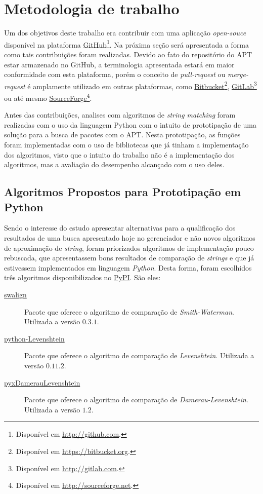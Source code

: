 \section{Metodologia de trabalho} %
\label{sec:contribuindo_com_plataformas_abertas}

Um dos objetivos deste trabalho era contribuir com uma aplicação \textit{open-souce} disponível na plataforma \href{http://github.com}{GitHub}\footnote{Disponível em \url{http://github.com}.}. Na próxima seção será apresentada a forma como tais contribuições foram realizadas. Devido ao fato do repositório do {\code APT} estar armazenado no GitHub, a terminologia apresentada estará em maior conformidade com esta plataforma, porém o conceito de \textit{pull-request} ou  \textit{merge-request} é amplamente utilizado em outras plataformas, como \href{https://bitbucket.org/}{Bitbucket}\footnote{Disponível em \url{https://bitbucket.org}.}, \href{https://gitlab.com/}{GitLab}\footnote{Disponível em \url{http://gitlab.com}.} ou até mesmo \href{http://sourceforge.net/}{SourceForge}\footnote{Disponível em \url{http://sourceforge.net}.}.

Antes das contribuições, analises com algoritmos de \textit{string matching} foram realizadas com o uso da linguagem Python com o intuito de prototipação de uma solução  para a busca de pacotes com o APT. Nesta prototipação, as funções foram implementadas com o uso de bibliotecas que já tinham a implementação dos algoritmos, visto que o intuito do trabalho não é a implementação dos algoritmos, mas a avaliação do desempenho alcançado com o uso deles.

\subsection*{Algoritmos Propostos para Prototipação em Python} %
\label{sec:algoritmos_propostos}

Sendo o interesse do estudo apresentar alternativas para a qualificação dos resultados de uma busca apresentado hoje no gerenciador e não novos algoritmos de aproximação de \textit{string}, foram priorizados algoritmos de implementação pouco rebuscada, que apresentassem bons resultados de comparação de \textit{strings} e que já estivessem implementados em linguagem \textit{Python}. Desta forma, foram escolhidos três algoritmos disponibilizados no \href{https://pypi.python.org/}{PyPI}. São eles:

\begin{description}
	\item [\href{https://pypi.python.org/pypi/swalign/}{swalign}]
	Pacote que oferece o algoritmo de comparação de \textit{Smith-Waterman}. Utilizada a versão $0.3.1$.
	\item [\href{https://pypi.python.org/pypi/python-Levenshtein/}{python-Levenshtein}]
	Pacote que oferece o algoritmo de comparação de \textit{Levenshtein}. Utilizada a versão $0.11.2$.
	\item [\href{https://pypi.python.org/pypi/pyxDamerauLevenshtein/}{pyxDamerauLevenshtein}]
	Pacote que oferece o algoritmo de comparação de \textit{Damerau-Levenshtein}. Utilizada a versão $1.2$.
\end{description}

